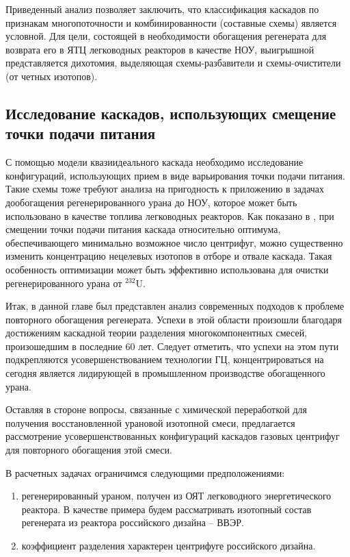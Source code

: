 Приведенный анализ позволяет заключить, что классификация каскадов по признакам многопоточности и комбинированности (составные схемы) является условной.
Для цели, состоящей в необходимости обогащения регенерата для возврата его в ЯТЦ легководных реакторов в качестве НОУ, выигрышной представляется дихотомия, выделяющая схемы-разбавители и схемы-очистители (от четных изотопов). 

\subsection{Исследование каскадов, использующих смещение точки подачи питания}
С помощью модели квазиидеального каскада необходимо исследование конфигураций, использующих прием в виде варьирования точки подачи питания. Такие схемы тоже требуют анализа на пригодность к приложению в задачах дообогащения регенерированного урана до НОУ, которое может быть использовано в качестве топлива легководных реакторов. Как показано в \cite{palk_2013}, при смещении точки подачи питания каскада относительно оптимума, обеспечивающего минимально возможное число центрифуг, можно существенно изменить концентрацию нецелевых изотопов в отборе и отвале каскада. Такая особенность оптимизации может быть эффективно использована для очистки регенерированного урана от $^{232}$U.

Итак, в данной главе был представлен анализ современных подходов к проблеме повторного обогащения регенерата. Успехи в этой области произошли благодаря достижениям каскадной теории разделения многокомпонентных смесей, произошедшим в последние 60 лет. Следует отметить, что успехи на этом пути подкрепляются усовершенствованием технологии ГЦ, концентрироваться на сегодня является лидирующей в промышленном производстве обогащенного урана.

Оставляя в стороне вопросы, связанные с химической переработкой для получения восстановленной урановой изотопной смеси, предлагается рассмотрение усовершенствованных конфигураций каскадов газовых центрифуг для повторного обогащения этой смеси. 

В расчетных задачах ограничимся следующими предположениями:

 \begin{enumerate}
  \item регенерированный ураном, получен из ОЯТ легководного энергетического реактора. В качестве примера будем рассматривать изотопный состав регенерата из реактора российского дизайна -- ВВЭР.
  \item коэффициент разделения характерен центрифуге российского дизайна.
\end{enumerate}